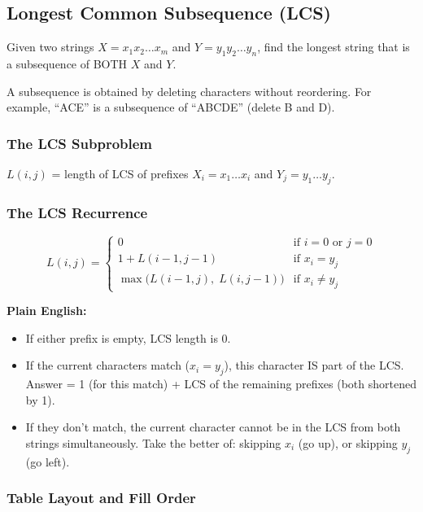\documentclass[12pt,portrait]{article}
\begin{document}
\subsection{Longest Common Subsequence (LCS)}
\label{sec:lcs}

\begin{rulebox}
Given two strings $X = x_1 x_2 \ldots x_m$ and $Y = y_1 y_2 \ldots y_n$, find the longest string that is a subsequence of BOTH $X$ and $Y$.

A subsequence is obtained by deleting characters without reordering. For example, ``ACE'' is a subsequence of ``ABCDE'' (delete B and D).
\end{rulebox}

\subsubsection{The LCS Subproblem}

$L(i,j)$ = length of LCS of prefixes $X_i = x_1 \ldots x_i$ and $Y_j = y_1 \ldots y_j$.

\subsubsection{The LCS Recurrence}

$$L(i,j) = \begin{cases}
0 & \text{if } i = 0 \text{ or } j = 0 \\[4pt]
1 + L(i-1, j-1) & \text{if } x_i = y_j \\[4pt]
\max\big(L(i-1, j),\; L(i, j-1)\big) & \text{if } x_i \neq y_j
\end{cases}$$

\textbf{Plain English:}
\begin{itemize}[leftmargin=*]
    \item If either prefix is empty, LCS length is 0.
    \item If the current characters match ($x_i = y_j$), this character IS part of the LCS. Answer = 1 (for this match) + LCS of the remaining prefixes (both shortened by 1).
    \item If they don't match, the current character cannot be in the LCS from both strings simultaneously. Take the better of: skipping $x_i$ (go up), or skipping $y_j$ (go left).
\end{itemize}

\subsubsection{Table Layout and Fill Order}
\end{document}
